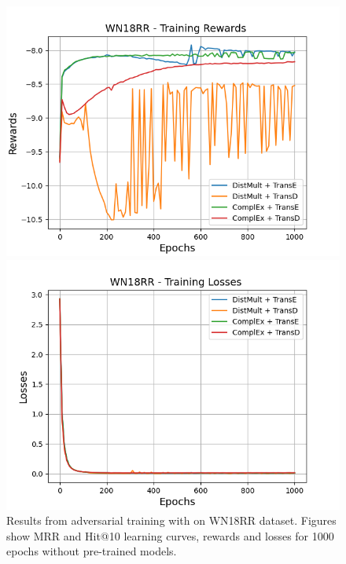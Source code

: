 \begin{figure}[H]
    \begin{minipage}{.5\textwidth}
      \centering
      \includegraphics[width=\linewidth]{figures/results/gan_train/not_pretrained/uncertainty/max/entropy/wn18rr/1k_epochs/uncertainty_wn18rr_rew.png}
    \end{minipage}%
     \begin{minipage}{.5\textwidth}
      \centering
      \includegraphics[width=\linewidth]{figures/results/gan_train/not_pretrained/uncertainty/max/entropy/wn18rr/1k_epochs/uncertainty_wn18rr_losses.png}
    \end{minipage}%
    \caption{Results from adversarial training with \usmax on \textsc{WN18RR} dataset.
    Figures show MRR and Hit@10 learning curves, rewards and losses for 1000 epochs without pre-trained models.}
    \label{fig:gan_train_not_pretrained_usmax_wn18rr}
\end{figure}
